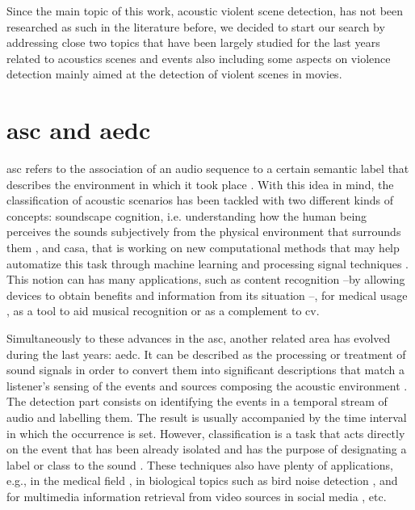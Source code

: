 
	Since the main topic of this work, acoustic violent scene detection, has not been researched as such in the literature before, we decided to start our search by addressing close two topics that have been largely studied for the last years related to acoustics scenes and events also including some aspects on violence detection mainly aimed at the detection of violent scenes in movies.
	
\section{\acrlong{asc} and \acrlong{aedc}}

	 \acrfull{asc} refers to the association of an audio sequence to a certain semantic label that describes the environment in which it took place \cite{Barchiesi2015}. With this idea in mind, the classification of acoustic scenarios has been tackled with two different kinds of concepts: soundscape cognition, i.e. understanding how the human being perceives the sounds subjectively from the physical environment that surrounds them  \cite{Dubois2006}, and  \acrfull{casa}, that is working on new computational methods that may help automatize this task through machine learning and processing signal techniques \cite{Wang2006}. This notion can has many applications, such as content recognition --by allowing devices to obtain benefits and information from its situation \cite{Eronen2006}--, for medical usage \cite{Bahoura2009}, as a tool to aid  musical recognition \cite{Van2013} or as a complement to \acrfull{cv}.
	
	Simultaneously to these advances in the \acrshort{asc}, another related area has evolved during the last years: %
	\acrfull{aedc}. It can be described as the processing or treatment of sound signals in order to convert them into significant descriptions that match a listener's sensing of the events and sources composing the acoustic environment \cite{Temko2009}. The detection part consists on identifying the events in a temporal stream of audio and labelling them. The result is usually accompanied by the time interval in which the occurrence is set. However, classification is a task that acts directly on the event that has been already isolated and has the purpose of designating a label or class to the sound \cite{Temko2007}. These techniques also have plenty of applications, e.g., in the medical field \cite{Bahoura2010}, in biological topics such as bird noise detection \cite{Potamitis2014}, and for multimedia information retrieval from video sources in social media \cite{Wang2016}, etc.

